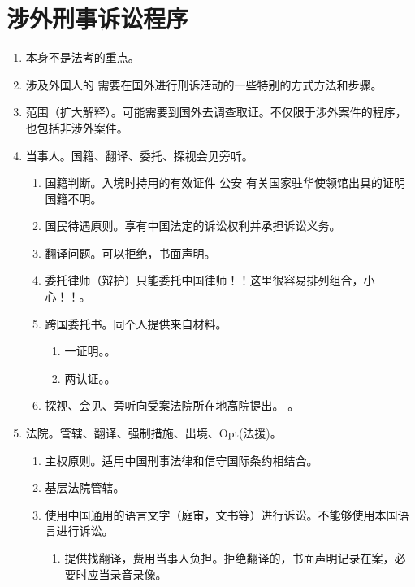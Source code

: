 \section{涉外刑事诉讼程序}
\begin{enumerate}
  \item 本身不是法考的重点。
  \item 涉及外国人的 \hz 需要在国外进行刑诉活动的一些特别的方式方法和步骤。
  \item 范围（扩大解释）。\yi 可能需要到国外去调查取证。\er 不仅限于涉外案件的程序，也包括非涉外案件。
  \item 当事人。国籍、翻译、委托、探视会见旁听。
        \begin{enumerate}
          \item 国籍判断。入境时持用的有效证件 \yjt 公安 \hz 有关国家驻华使领馆出具的证明 \yjt 国籍不明。
          \item 国民待遇原则。享有中国法定的诉讼权利并承担诉讼义务。
          \item 翻译问题。可以拒绝，书面声明。
          \item 委托律师（辩护）只能委托中国律师！！这里很容易排列组合，小心！！。
          \item 跨国委托书。同个人提供来自材料。
                \begin{enumerate}
                  \item 一证明。。
                  \item 两认证。。
                \end{enumerate}
          \item 探视、会见、旁听向受案法院所在地高院提出。
                。
        \end{enumerate}
  \item 法院。管辖、翻译、强制措施、出境、Opt(法援)。
        \begin{enumerate}
          \item 主权原则。适用中国刑事法律和信守国际条约相结合。
          \item 基层法院管辖。
          \item 使用中国通用的语言文字（庭审，文书等）进行诉讼。\bdy 不能够使用本国语言进行诉讼。
                \begin{enumerate}
                  \item 提供找翻译，费用当事人负担。拒绝翻译的，书面声明记录在案，必要时应当录音录像。

\end{enumerate}
\end{enumerate}
\end{enumerate}
